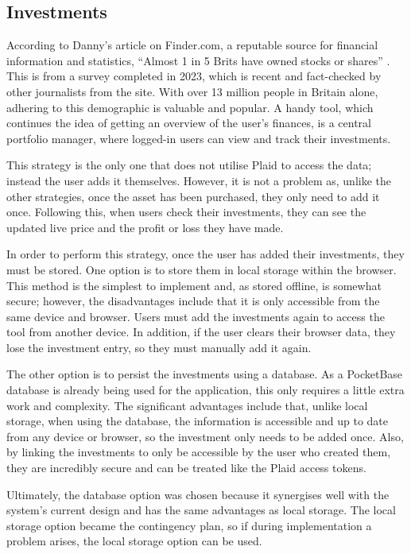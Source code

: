 \subsection{Investments}
According to Danny's article on Finder.com, a reputable source for financial information and statistics, ``Almost 1 in 5 Brits have owned stocks or shares'' \cite{InvestmentStats}. This is from a survey completed in 2023, which is recent and fact-checked by other journalists from the site. With over 13 million people in Britain alone, adhering to this demographic is valuable and popular. A handy tool, which continues the idea of getting an overview of the user's finances, is a central portfolio manager, where logged-in users can view and track their investments.

This strategy is the only one that does not utilise Plaid to access the data; instead the user adds it themselves. However, it is not a problem as, unlike the other strategies, once the asset has been purchased, they only need to add it once. Following this, when users check their investments, they can see the updated live price and the profit or loss they have made.

In order to perform this strategy, once the user has added their investments, they must be stored. One option is to store them in local storage within the browser. This method is the simplest to implement and, as stored offline, is somewhat secure; however, the disadvantages include that it is only accessible from the same device and browser. Users must add the investments again to access the tool from another device. In addition, if the user clears their browser data, they lose the investment entry, so they must manually add it again.

The other option is to persist the investments using a database. As a PocketBase database is already being used for the application, this only requires a little extra work and complexity. The significant advantages include that, unlike local storage, when using the database, the information is accessible and up to date from any device or browser, so the investment only needs to be added once. Also, by linking the investments to only be accessible by the user who created them, they are incredibly secure and can be treated like the Plaid access tokens.

Ultimately, the database option was chosen because it synergises well with the system's current design and has the same advantages as local storage. The local storage option became the contingency plan, so if during implementation a problem arises, the local storage option can be used.

